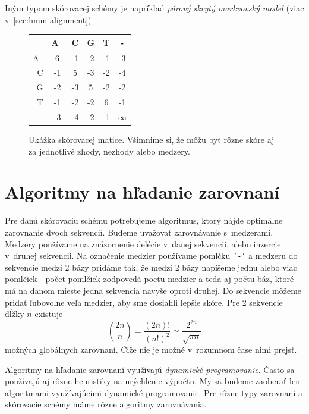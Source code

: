 Iným typom skórovacej schémy je napríklad \textit{párový skrytý markvovský model} (viac v~\ref{sec:hmm-alignment})

\begin{figure}[hbtp]
    \centering
    \begin{tabular}{r|ccccc}
    & A~& C & G & T & -\\
    \hline
    A~& 6 & -1 & -2 & -1 & -3\\
    C & -1 & 5 & -3 & -2 & -4\\
    G & -2 & -3 & 5 & -2 & -2\\
    T & -1 & -2 & -2 & 6 & -1\\
    - & -3 & -4 & -2 & -1 & $\infty$\\
    \end{tabular}
    \caption[Skórovacia matica]{Ukážka skórovacej matice. Všimnime si, že môžu byť rôzne skóre aj za jednotlivé zhody, nezhody alebo medzery.}
    \label{fig:scoringmatrix}
\end{figure}

\section[Algoritmy]{Algoritmy na hľadanie zarovnaní}
Pre danú skórovaciu schému potrebujeme algoritmus, ktorý nájde optimálne zarovnanie dvoch sekvencií.
Budeme uvažovať zarovnávanie s~medzerami. Medzery používame na znázornenie delécie v~danej sekvencii, alebo inzercie v~druhej sekvencii. Na označenie medzier používame pomlčku {\tt'-'} a medzeru do sekvencie medzi 2 bázy pridáme tak, že medzi 2 bázy napíšeme jednu alebo viac pomlčiek - počet pomlčiek zodpovedá poctu medzier a teda aj počtu báz, ktoré má na danom mieste jedna sekvencia navyše oproti druhej. Do sekvencie môžeme pridať ľubovoľne veľa medzier, aby sme dosiahli lepšie skóre. Pre 2 sekvencie dĺžky $n$ existuje
$$ {2n \choose n}  = \frac{(2n)!}{(n!)^2} \simeq \frac{2^{2n}}{\sqrt{\pi n}} $$
možných globálnych zarovnaní. \cite{durbin} Čiže nie je možné v~rozumnom čase nimi prejsť.

Algoritmy na hľadanie zarovnaní využívajú \textit{dynamické programovanie}.
Často sa používajú aj rôzne heuristiky na urýchlenie výpočtu.
My sa budeme zaoberať len algoritmami využívajúcimi dynamické programovanie. Pre rôzne typy zarovnaní a skórovacie schémy máme rôzne algoritmy zarovnávania.
\cite{durbin, skripta}

